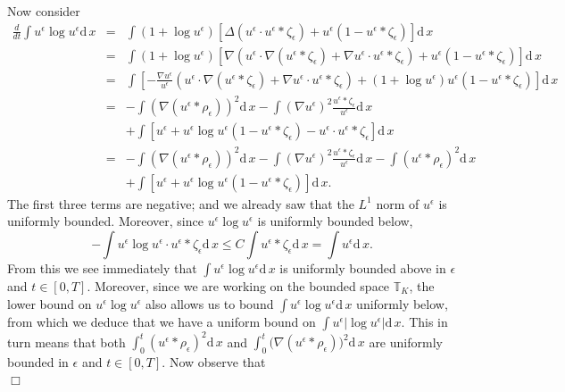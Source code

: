\documentclass[12pt]{article}
\newenvironment {proof}{{\noindent\bf Proof }}{\hfill $\Box$ \medskip}
\newcommand{\IT}{\mathbb T}
\newcommand{\dif}{\mathrm{d}\,}
\begin{document}
\begin{proof}
Now consider
\begin{eqnarray*}
\frac{d}{dt}\int u^\epsilon\log u^\epsilon \dif x &=&
\int (1+\log u^\epsilon)\left[\Delta (u^\epsilon\cdot
u^\epsilon*\zeta_\epsilon)+u^\epsilon(1-u^\epsilon*\zeta_\epsilon)\right]
\dif x
\\
&=&
\int (1+\log u^\epsilon)\left[\nabla\left(u^\epsilon\cdot
\nabla(u^\epsilon*\zeta_\epsilon)+
\nabla u^\epsilon\cdot u^\epsilon*\zeta_\epsilon\right)
+u^\epsilon(1-u^\epsilon*\zeta_\epsilon)\right] \dif x
\\
&=&
\int \left[-\frac{\nabla u^\epsilon}{u^\epsilon}
\left(u^\epsilon\cdot \nabla(u^\epsilon*\zeta_\epsilon)
+\nabla u^\epsilon\cdot u^\epsilon*\zeta_\epsilon\right)+
(1+\log u^\epsilon)u^\epsilon(1-u^\epsilon*\zeta_\epsilon)\right]\dif x
\\
&=&
-\int \left(\nabla (u^\epsilon*\rho_\epsilon)\right)^2 \dif x
-\int (\nabla u^\epsilon)^2\frac{u^\epsilon*\zeta_\epsilon}{u^\epsilon} \dif x
\\
&&+\int
\left[u^\epsilon+u^\epsilon\log u^\epsilon(1-u^\epsilon*\zeta_\epsilon)
-u^\epsilon\cdot u^\epsilon*\zeta_\epsilon\right]\dif x\\
&=&
-\int \left(\nabla (u^\epsilon*\rho_\epsilon)\right)^2 \dif x
-\int (\nabla u^\epsilon)^2\frac{u^\epsilon*\zeta_\epsilon}{u^\epsilon} \dif x
-\int (u^\epsilon*\rho_\epsilon)^2\dif x
\\
&&+\int
\left[u^\epsilon+u^\epsilon\log u^\epsilon(1-u^\epsilon*\zeta_\epsilon)
\right]\dif x .
\end{eqnarray*}
The first three terms are negative; and we already
saw that the $L^1$ norm
of $u^\epsilon$ is uniformly bounded.
Moreover, since $u^\epsilon\log u^\epsilon$ is uniformly bounded below,
$$-\int u^\epsilon \log u^\epsilon \cdot u^\epsilon*\zeta_\epsilon \dif x
\leq C\int u^\epsilon*\zeta_\epsilon \dif x=\int u^\epsilon \dif x.$$
From this we see immediately that $\int u^\epsilon \log u^\epsilon \dif x$
is uniformly bounded
above in $\epsilon$ and $t\in [0,T]$. Moreover,
since we are working on the bounded space $\IT_K$, the lower bound
on $u^\epsilon\log u^\epsilon$ also allows us to
bound $\int u^\epsilon\log u^\epsilon \dif x$ uniformly
below, from which we deduce that
we have a uniform bound on $\int u^\epsilon|\log u^\epsilon| \dif x$.
This in turn means that both
$\int_0^t (u^\epsilon*\rho_\epsilon)^2 \dif x$ and
$\int_0^t \big(\nabla (u^\epsilon*\rho_\epsilon)\big)^2 \dif x$
are uniformly bounded in
$\epsilon$ and $t\in [0,T]$.
Now observe that
\begin{equation}

\end{equation}
\end{proof}
\end{document}
